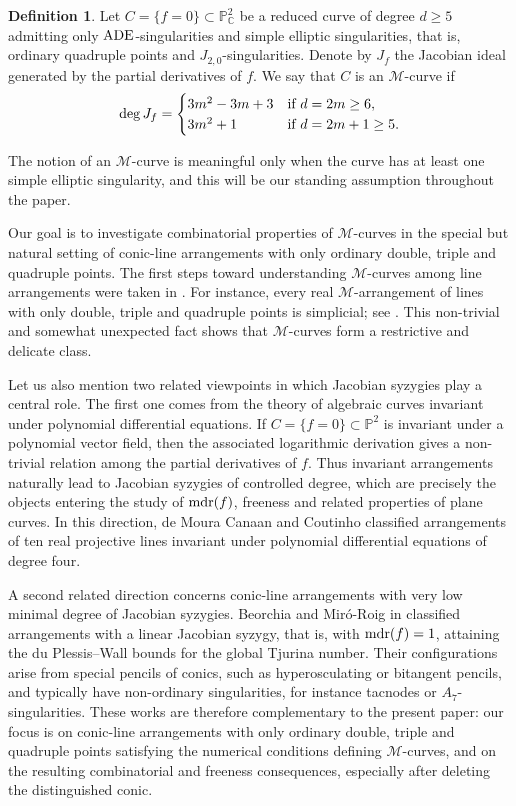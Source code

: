 \documentclass[11pt]{article}
\theoremstyle{plain}
\theoremstyle{definition}
\newtheorem{definition}[theorem]{Definition}
\theoremstyle{remark}
\begin{document}
\begin{definition}
Let \(C=\{f=0\}\subset \mathbb{P}^{2}_{\mathbb C}\) be a reduced curve of degree
\(d\geq 5\) admitting only \({\rm ADE}\)-singularities and simple elliptic singularities,
that is, ordinary quadruple points and \(J_{2,0}\)-singularities. Denote by \(J_f\) the
Jacobian ideal generated by the partial derivatives of \(f\). We say that \(C\) is an
\(\mathscr{M}\)-curve if
\[
{\rm deg}\,J_f=
\begin{cases}
3m^{2}-3m+3 & \text{if } d=2m\geq 6,\\
3m^{2}+1 & \text{if } d=2m+1\geq 5.
\end{cases}
\]
\end{definition}

The notion of an \(\mathscr{M}\)-curve is meaningful only when the curve has at least
one simple elliptic singularity, and this will be our standing assumption throughout
the paper.

Our goal is to investigate combinatorial properties of \(\mathscr{M}\)-curves in the
special but natural setting of conic-line arrangements with only ordinary double,
triple and quadruple points. The first steps toward understanding
\(\mathscr{M}\)-curves among line arrangements were taken in \cite{JanLes05}. For
instance, every real \(\mathscr{M}\)-arrangement of lines with only double, triple and
quadruple points is simplicial; see \cite{JanLes05}. This non-trivial and somewhat
unexpected fact shows that \(\mathscr{M}\)-curves form a restrictive and delicate class.

Let us also mention two related viewpoints in which Jacobian syzygies play a central role.
The first one comes from the theory of algebraic curves invariant under polynomial
differential equations. If \(C=\{f=0\}\subset \mathbb P^2\) is invariant under a polynomial
vector field, then the associated logarithmic derivation gives a non-trivial relation among
the partial derivatives of \(f\). Thus invariant arrangements naturally lead to Jacobian
syzygies of controlled degree, which are precisely the objects entering the study of
\({\rm mdr}(f)\), freeness and related properties of plane curves. In this direction,
de Moura Canaan and Coutinho \cite{CC} classified arrangements of ten real projective
lines invariant under polynomial differential equations of degree four.

A second related direction concerns conic-line arrangements with very low minimal degree
of Jacobian syzygies. Beorchia and Mir\'o-Roig in \cite{BM} classified arrangements with a
linear Jacobian syzygy, that is, with \({\rm mdr}(f)=1\), attaining the du Plessis--Wall
bounds for the global Tjurina number. Their configurations arise from special pencils of
conics, such as hyperosculating or bitangent pencils, and typically have non-ordinary
singularities, for instance tacnodes or \(A_7\)-singularities. These works are therefore
complementary to the present paper: our focus is on conic-line arrangements with only
ordinary double, triple and quadruple points satisfying the numerical conditions defining
\(\mathscr{M}\)-curves, and on the resulting combinatorial and freeness consequences,
especially after deleting the distinguished conic.
\end{document}
